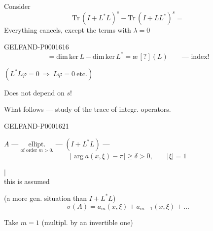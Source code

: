 Consider
\begin{equation*}
\mathrm{Tr}\,(I+L^*L)^s-\mathrm{Tr}\,(I+LL^*)^s=
\end{equation*}
Everything cancels, except the terms with $\lambda=0$

\begin{GelfandAdjacentEvidence}{GELFAND-P000161}{6}
\begin{equation*}
=\mathrm{dim}\,\mathrm{ker}\, L-\mathrm{dim}\,\mathrm{ker}\, L^*=\text{\ae}\, [?](L)\qquad\text{--- index!}
\end{equation*}
\end{GelfandAdjacentEvidence}


$(L^*L\varphi=0\ \Rightarrow\ L\varphi=0\ \text{etc.})$

Does not depend on $s$!


What follows --- study of the trace of integr. operators.



\begin{GelfandAdjacentEvidence}{GELFAND-P000162}{1}
\hfill{}


$A$ --- $\underset{\text{of order }m>0.}{\text{ellipt.}}$ --- $(I+L^*L)$ ---
\begin{equation*}
|\arg a (x,\xi)-\pi|\geq\delta>0,\qquad |\xi|=1
\end{equation*}
\begin{center}
$\vert$\\[-.3ex]
this is assumed
\end{center}
(a more gen. situation than $I+L^*L$)
\begin{equation*}
\sigma (A)=a_m (x,\xi)+a_{m-1}(x,\xi)+\ldots
\end{equation*}
\end{GelfandAdjacentEvidence}


Take $m=1$ (multipl. by an invertible one)

